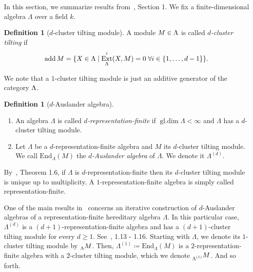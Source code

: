 \documentclass[a4paper,oneside,svgnames,draft]{amsart}
\theoremstyle{plain}
\theoremstyle{definition}
\newtheorem{definition}[theorem]{Definition}
\let\mod\relax
\DeclareMathOperator{\ext}{Ext}
\DeclareMathOperator{\add}{add}
\DeclareMathOperator{\mod}{mod}
\DeclareMathOperator{\gldim}{gl.dim}
\begin{document}
 In this section, we summarize results from~\cite{iyama}, Section 1. We fix a
 finite-dimensional algebra $\Lambda$ over a field $k$.

 \begin{definition}[$d$-cluster tilting module]
  A module $M \in \mod \Lambda$ is called \emph{$d$-cluster tilting} if
  \[
   \add M = \{X \in \mod \Lambda \mid \ext^{i}_{\Lambda}(X,M) = 0 \; \forall i
   \in \{1,\ldots,d-1\}\}.
  \]
 \end{definition}
 We note that a $1$-cluster tilting module is just an additive generator of the
 category $\mod \Lambda$.
 \begin{definition}[$d$-Auslander algebra]
  \leavevmode
  \begin{enumerate}
   \item An algebra $\Lambda$ is called \emph{$d$-representation-finite} if
    $\gldim\Lambda<\infty$ and $\Lambda$ has a $d$-cluster tilting module.
   \item Let $\Lambda$ be a $d$-representation-finite algebra and $M$ its
    $d$-cluster tilting module. We call $\mathrm{End}_{\Lambda}(M)$ the
    \emph{$d$-Auslander algebra} of $\Lambda$. We denote it $\Lambda^{(d)}$.
  \end{enumerate}
 \end{definition}

 By~\cite{iyama}, Theorem 1.6, if $\Lambda$ is $d$-representation-finite then
 its $d$-cluster tilting module is unique up to multiplicity. A
 $1$-representation-finite algebra is simply called representation-finite.

 One of the main results in~\cite{iyama} concerns an iterative construction of
 $d$-Auslander algebras of a representation-finite hereditary algebra $\Lambda$.
 In this particular case, $\Lambda^{(d)}$ is a $(d+1)$-representation-finite
 algebra and has a $(d+1)$-cluster tilting module for every $d \geq 1$.
 See~\cite{iyama}, 1.13 - 1.16. Starting with $\Lambda$, we denote its
 $1$-cluster tilting module by $\prescript{}{\Lambda}M$. Then, $\Lambda^{(1)}
 \coloneqq \mathrm{End}_{\Lambda}(M)$ is a $2$-representation-finite algebra
 with a $2$-cluster tilting module, which we denote
 $\prescript{}{\Lambda^{(1)}}M$. And so forth.

 
\end{document}
